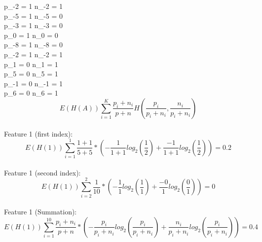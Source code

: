 \documentclass[12pt]{article}
\begin{document}
\begin{enumerate}
\begin{enumerate}
	p_{-2} = 1 \hspace{1cm}      	n_{-2} = 1\\ 
	p_{-5} = 1 \hspace{1cm}      	n_{-5} = 0\\ 
	p_{-3} = 1 \hspace{1cm}      	n_{-3} = 0 \\ 
	p_{0} = 1 \hspace{1cm}      	n_{0} = 0\\ 
	p_{-8} = 1 \hspace{1cm}      	n_{-8} = 0\\ 
	p_{-2} = 1 \hspace{1cm}      	n_{-2} = 1\\ 
	p_{1} = 0 \hspace{1cm}      	n_{1} = 1\\ 
	p_{5} = 0 \hspace{1cm}      	n_{5} = 1\\ 
	p_{-1} = 0 \hspace{1cm}      	n_{-1} = 1\\ 
	p_{6} = 0 \hspace{1cm}      	n_{6} = 1\\ 
	

	$$	E(H(A)) \sum_{i=1}^{K} \frac{p_{i}+n_{i}}{p + n} H \left (\frac{p_{i}}{p_{i}+n_{i}} , \frac{n_{i}}{p_{i}+n_{i}}\right)$$ \\
	
	Feature 1 (first index): \\
	
	$$	E(H(1)) \sum_{i=1}^{1} \frac{1+1}{5+5} * \left (-\frac{1}{1+1}log_{2} \left(\frac{1}{2}\right) + \frac{-1}{1+1}log_{2}\left(\frac{1}{2}\right)\right) = 0.2 $$ \\
	
	
	Feature 1 (second index): \\
	
	$$	E(H(1)) \sum_{i=2}^{2} \frac{1}{10} * \left (-\frac{1}{1}log_{2} \left(\frac{1}{1}\right) + \frac{-0}{1}log_{2}\left(\frac{0}{1}\right)\right) = 0 $$ \\
	
	Feature 1 (Summation): \\
	
	$$	E(H(1)) \sum_{i=1}^{10} \frac{p_{i}+n_{i}}{p + n} * \left (-\frac{p_{i}}{p_{i}+n_{i}}log_{2} \left(\frac{p_{i}}{p_{i}+n_{i}}\right) + \frac{n_{i}}{p_{i}+n_{i}}log_{2}\left(\frac{p_{i}}{p_{i}+n_{i}}\right)\right) = 0.4 $$ \\
	

\end{enumerate}
\end{enumerate}
\end{document}
